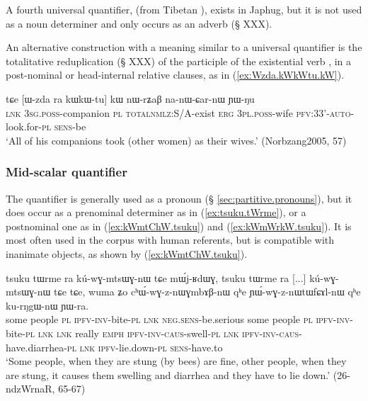  A fourth universal quantifier,  (from Tibetan ), exists in Japhug, but it is not used as a noun determiner and only occurs as an adverb (§ XXX).
% 

An alternative construction with a meaning similar to a universal quantifier is the totalitative reduplication (§ XXX)  of the participle of the existential verb , in a post-nominal or head-internal relative clauses, as in (\ref{ex:Wzda.kWkWtu.kW}). 

 \begin{exe}
\ex \label{ex:Wzda.kWkWtu.kW}
\gll tɕe [ɯ-zda ra kɯ\redp{}kɯ-tu] kɯ nɯ-rʑaβ na-nɯ-ɕar-nɯ ɲɯ-ŋu \\
\textsc{lnk} \textsc{3sg}.\textsc{poss}-companion \textsc{pl} \textsc{total}\redp{}\textsc{nmlz}:S/A-exist \textsc{erg} \textsc{3pl}.\textsc{poss}-wife \textsc{pfv}:3\fl{}3'-\textsc{auto}-look.for-\textsc{pl} \textsc{sens}-be \\
\glt `All of his companions took (other women) as their wives.' (Norbzang2005, 57)
  \end{exe}

\subsubsection{Mid-scalar quantifier} \label{sec:tsuku}
The quantifier  is generally used as a pronoun (§ \ref{sec:partitive.pronouns}), but it does occur as a prenominal determiner as in (\ref{ex:tsuku.tWrme}), or a postnominal one as in (\ref{ex:kWmtChW.tsuku}) and (\ref{ex:kWmWrkW.tsuku}). It is most often used in the corpus with human referents, but is compatible with inanimate objects, as shown by (\ref{ex:kWmtChW.tsuku}).

\begin{exe}
\ex \label{ex:tsuku.tWrme}
\gll tsuku tɯrme ra kú-wɣ-mtsɯɣ-nɯ tɕe mɯ́j-ʁdɯɣ, tsuku tɯrme ra [...] kú-wɣ-mtsɯɣ-nɯ tɕe tɕe, wuma ʑo cʰɯ́-wɣ-z-nɯɣmbɤβ-nɯ qʰe ɲɯ́-wɣ-z-nɯtɯfɕɤl-nɯ qʰe ku-rŋgɯ-nɯ ɲɯ-ra.\\
some people \textsc{pl} \textsc{ipfv}-\textsc{inv}-bite-\textsc{pl} \textsc{lnk} \textsc{neg}.\textsc{sens}-be.serious some people \textsc{pl} { } \textsc{ipfv}-\textsc{inv}-bite-\textsc{pl} \textsc{lnk} \textsc{lnk} really \textsc{emph} \textsc{ipfv}-\textsc{inv}-\textsc{caus}-swell-\textsc{pl} \textsc{lnk}  \textsc{ipfv}-\textsc{inv}-\textsc{caus}-have.diarrhea-\textsc{pl} \textsc{lnk} \textsc{ipfv}-lie.down-\textsc{pl} \textsc{sens}-have.to\\
\glt `Some people, when they are stung (by bees) are fine, other people, when they are stung, it causes them swelling and diarrhea and they have to lie down.' (26-ndzWrnaR, 65-67)
\end{exe}

